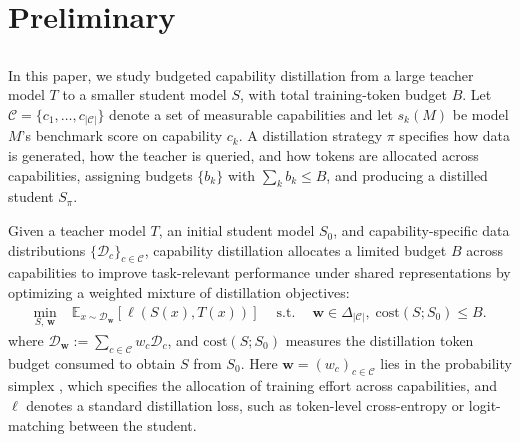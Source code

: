 \section{Preliminary}
\label{sec:prelim}


\subsection{}
\label{sec:prelim:setup}

In this paper, we study budgeted capability distillation from a large teacher model \(T\) to a
smaller student model \(S\), with total training-token budget \(B\). Let
\(\mathcal{C}=\{c_1,\ldots,c_{|\mathcal{C}|}\}\) denote a set of measurable
capabilities and let \(s_k(M)\) be model \(M\)'s benchmark score on capability
\(c_k\). A distillation strategy \(\pi\) specifies how data is generated, how
the teacher is queried, and how tokens are allocated across capabilities,
assigning budgets \(\{b_k\}\) with \(\sum_k b_k\le B\), and producing a
distilled student \(S_\pi\).

\begin{definition}\label{def:cap_distill}
Given a teacher model \( T \), an initial student model \( S_0 \), and
capability-specific data distributions \( \{ \mathcal{D}_c \}_{c\in\mathcal{C}} \),
capability distillation allocates a limited budget \( B \) across capabilities
to improve task-relevant performance under shared representations by optimizing
a weighted mixture of distillation objectives:
\begin{equation}
\begin{aligned}
\min_{S,\,\mathbf{w}} \;&
\mathbb{E}_{x\sim \mathcal{D}_{\mathbf{w}}}
\!\left[\ell\!\left(S(x),T(x)\right)\right] \quad\
\text{s.t.} \quad\
\mathbf{w}\in\Delta_{|\mathcal{C}|},\; \mathrm{cost}(S;S_0)\le B .
\end{aligned}
\end{equation}
where \( \mathcal{D}_{\mathbf{w}} := \sum_{c\in\mathcal{C}} w_c \mathcal{D}_c \), and $\mathrm{cost}(S;S_0)$ measures the distillation token budget consumed to obtain $S$ from $S_0$.
Here \( \mathbf{w}=(w_c)_{c\in\mathcal{C}} \) lies in the probability simplex
\rev{\( \Delta_{|\mathcal{C}|}=\{\mathbf{w}\in\mathbb{R}^{|\mathcal{C}|} \mid w_c\ge 0,\ \sum_{c\in\mathcal{C}} w_c=1\} \)},
which specifies the allocation of training effort across capabilities, and
\( \ell \) denotes a standard distillation loss, such as token-level
cross-entropy or logit-matching between the student.
\end{definition}


